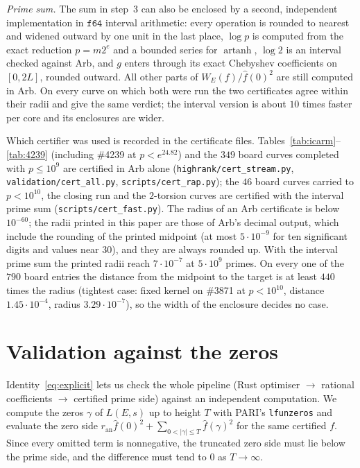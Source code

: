 \documentclass[11pt]{amsart}
\theoremstyle{remark}
\theoremstyle{definition}
\newcommand{\ran}{r_{\mathrm{an}}}
\begin{document}
\emph{Prime sum.} The sum in step~3 can also be enclosed by a second, independent implementation in $\mathtt{f64}$ interval arithmetic: every operation is rounded to nearest and widened outward by one unit in the last place, $\log p$ is computed from the exact reduction $p=m2^e$ and a bounded series for $\operatorname{artanh}$, $\log 2$ is an interval checked against Arb, and $g$ enters through its exact Chebyshev coefficients on $[0,2L]$, rounded outward. All other parts of $W_E(f)/\hat f(0)^2$ are still computed in Arb. On every curve on which both were run the two certificates agree within their radii and give the same verdict; the interval version is about $10$ times faster per core and its enclosures are wider.

Which certifier was used is recorded in the certificate files. Tables~\ref{tab:icarm}--\ref{tab:4239} (including \#4239 at $p<e^{24.82}$) and the $349$ board curves completed with $p\le10^9$ are certified in Arb alone (\texttt{highrank/cert\_stream.py}, \texttt{validation/cert\_all.py}, \texttt{scripts/cert\_rap.py}); the $46$ board curves carried to $p<10^{10}$, the closing run and the $2$-torsion curves are certified with the interval prime sum (\texttt{scripts/cert\_fast.py}). The radius of an Arb certificate is below $10^{-60}$; the radii printed in this paper are those of Arb's decimal output, which include the rounding of the printed midpoint (at most $5\cdot10^{-9}$ for ten significant digits and values near $30$), and they are always rounded up. With the interval prime sum the printed radii reach $7\cdot10^{-7}$ at $5\cdot10^9$ primes. On every one of the $790$ board entries the distance from the midpoint to the target is at least $440$ times the radius (tightest case: fixed kernel on \#3871 at $p<10^{10}$, distance $1.45\cdot10^{-4}$, radius $3.29\cdot10^{-7}$), so the width of the enclosure decides no case.

\section{Validation against the zeros}\label{sec:zeros}

Identity~\eqref{eq:explicit} lets us check the whole pipeline (Rust optimiser $\to$ rational coefficients $\to$ certified prime side) against an independent computation. We compute the zeros $\gamma$ of $L(E,s)$ up to height $T$ with PARI's \texttt{lfunzeros} and evaluate the zero side $\ran\hat f(0)^2+\sum_{0<|\gamma|\le T}\hat f(\gamma)^2$ for the same certified $f$. Since every omitted term is nonnegative, the truncated zero side must lie below the prime side, and the difference must tend to $0$ as $T\to\infty$.
\end{document}
